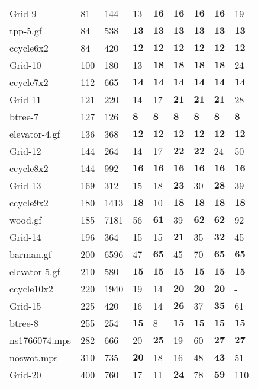 \documentclass{article}
\begin{document}
\begin{longtable}{|l |l |l |l |l |l |l |l |l |}
Grid-9&81&144&13&$\mathbf{16}$&$\mathbf{16}$&$\mathbf{16}$&$\mathbf{16}$&19\\
tpp-5.gf&84&538&$\mathbf{13}$&$\mathbf{13}$&$\mathbf{13}$&$\mathbf{13}$&$\mathbf{13}$&$\mathbf{13}$\\
ccycle6x2&84&420&$\mathbf{12}$&$\mathbf{12}$&$\mathbf{12}$&$\mathbf{12}$&$\mathbf{12}$&$\mathbf{12}$\\
Grid-10&100&180&13&$\mathbf{18}$&$\mathbf{18}$&$\mathbf{18}$&$\mathbf{18}$&24\\
ccycle7x2&112&665&$\mathbf{14}$&$\mathbf{14}$&$\mathbf{14}$&$\mathbf{14}$&$\mathbf{14}$&$\mathbf{14}$\\
Grid-11&121&220&14&17&$\mathbf{21}$&$\mathbf{21}$&$\mathbf{21}$&28\\
btree-7&127&126&$\mathbf{8}$&$\mathbf{8}$&$\mathbf{8}$&$\mathbf{8}$&$\mathbf{8}$&$\mathbf{8}$\\
elevator-4.gf&136&368&$\mathbf{12}$&$\mathbf{12}$&$\mathbf{12}$&$\mathbf{12}$&$\mathbf{12}$&$\mathbf{12}$\\
Grid-12&144&264&14&17&$\mathbf{22}$&$\mathbf{22}$&24&50\\
ccycle8x2&144&992&$\mathbf{16}$&$\mathbf{16}$&$\mathbf{16}$&$\mathbf{16}$&$\mathbf{16}$&$\mathbf{16}$\\
Grid-13&169&312&15&18&$\mathbf{23}$&30&$\mathbf{28}$&39\\
ccycle9x2&180&1413&$\mathbf{18}$&10&$\mathbf{18}$&$\mathbf{18}$&$\mathbf{18}$&$\mathbf{18}$\\
wood.gf&185&7181&56&$\mathbf{61}$&39&$\mathbf{62}$&$\mathbf{62}$&92\\
Grid-14&196&364&15&15&$\mathbf{21}$&35&$\mathbf{32}$&45\\
barman.gf&200&6596&47&$\mathbf{65}$&45&70&$\mathbf{65}$&$\mathbf{65}$\\
elevator-5.gf&210&580&$\mathbf{15}$&$\mathbf{15}$&$\mathbf{15}$&$\mathbf{15}$&$\mathbf{15}$&$\mathbf{15}$\\
ccycle10x2&220&1940&19&14&$\mathbf{20}$&$\mathbf{20}$&$\mathbf{20}$&-\\
Grid-15&225&420&16&14&$\mathbf{26}$&37&$\mathbf{35}$&61\\
btree-8&255&254&$\mathbf{15}$&8&$\mathbf{15}$&$\mathbf{15}$&$\mathbf{15}$&$\mathbf{15}$\\
ns1766074.mps&282&666&20&$\mathbf{25}$&19&60&$\mathbf{27}$&$\mathbf{27}$\\
noswot.mps&310&735&$\mathbf{20}$&18&16&48&$\mathbf{43}$&51\\
Grid-20&400&760&17&11&$\mathbf{24}$&78&$\mathbf{59}$&110\\

\end{longtable}
\end{document}
